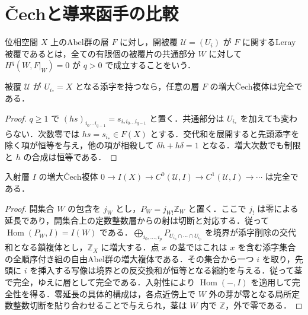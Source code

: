 \section{Čechと導来函手の比較}
\begin{defn}[Leray被覆]
位相空間 $X$ 上のAbel群の層 $F$ に対し，開被覆 $\mathcal U=(U_i)$ が $F$ に関するLeray被覆であるとは，全ての有限個の被覆片の共通部分 $W$ に対して $H^q(W,F|_W)=0$ が $q>0$ で成立することをいう．
\end{defn}
\begin{prop}[被覆片を全体に含むČech複体]
被覆 $\mathcal U$ が $U_{i_*}=X$ となる添字を持つなら，任意の層 $F$ の増大Čech複体は完全である．
\end{prop}
\begin{proof}
$q\geq1$ で $(hs)_{i_0\ldots i_{q-1}}=s_{i_*i_0\ldots i_{q-1}}$ と置く．共通部分は $U_{i_*}$ を加えても変わらない．次数零では $hs=s_{i_*}\in F(X)$ とする．交代和を展開すると先頭添字を除く項が恒等を与え，他の項が相殺して $\delta h+h\delta=1$ となる．増大次数でも制限と $h$ の合成は恒等である．
\end{proof}
\begin{prop}[入射層のČech複体の完全性]
入射層 $I$ の増大Čech複体 $0\to I(X)\to C^0(\mathcal U,I)\to C^1(\mathcal U,I)\to\cdots$ は完全である．
\end{prop}
\begin{proof}
開集合 $W$ の包含を $j_W$ とし，$P_W=j_{W!}\mathbb Z_W$ と置く．ここで $j_!$ は零による延長であり，開集合上の定数整数層からの射は切断と対応する．従って $\operatorname{Hom}(P_W,I)=I(W)$ である．$\bigoplus_{i_0,\ldots,i_p}P_{U_{i_0}\cap\cdots\cap U_{i_p}}$ を境界が添字削除の交代和となる鎖複体とし，$\mathbb Z_X$ に増大する．点 $x$ の茎ではこれは $x$ を含む添字集合の全順序付き組の自由Abel群の増大複体である．その集合から一つ $i$ を取り，先頭に $i$ を挿入する写像は境界との反交換和が恒等となる縮約を与える．従って茎で完全，ゆえに層として完全である．入射性により $\operatorname{Hom}(-,I)$ を適用して完全性を得る．零延長の具体的構成は，各点近傍上で $W$ 外の芽が零となる局所定数整数切断を貼り合わせることで与えられ，茎は $W$ 内で $\mathbb Z$，外で零である．
\end{proof}
